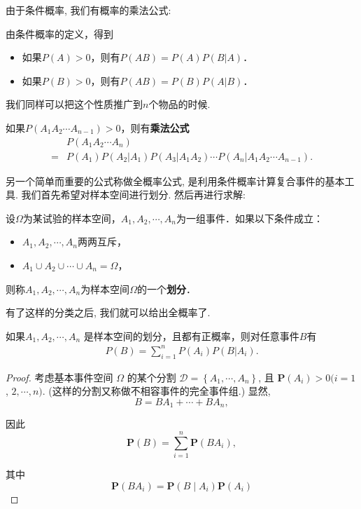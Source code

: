 由于条件概率, 我们有概率的乘法公式:

\begin{theorem}[乘法公式]
    由条件概率的定义，得到
    \begin{itemize}
        \item 如果$P(A)>0$，则有$P(AB)=P(A)P(B|A)$．
        \item 如果$P(B)>0$，则有$P(AB)=P(B)P(A|B)$．
    \end{itemize}
\end{theorem}

我们同样可以把这个性质推广到$n$个物品的时候.

\begin{corollary}
    如果$P(A_1 A_2\cdots A_{n-1})>0$，则有\textbf{乘法公式}
    \begin{align*}
          & P(A_1A_2\cdots A_n)                                                \\
        = & P(A_1)P(A_2|A_1)P(A_3|A_1 A_2)\cdots P(A_n|A_1 A_2\cdots A_{n-1}).
    \end{align*}
\end{corollary}



另一个简单而重要的公式称做全概率公式, 是利用条件概率计算复合事件的基本工具. 我们首先希望对样本空间进行划分. 然后再进行求解:

\begin{definition}
    设$\Omega$为某试验的样本空间，$A_1, A_2, \cdots, A_n$为一组事件．如果以下条件成立：
    \begin{itemize}
        \item $A_1, A_2, \cdots, A_n$两两互斥，
        \item $A_1 \cup A_2 \cup \cdots \cup A_n=\Omega$，
    \end{itemize}
    则称$A_1, A_2, \cdots , A_n$为样本空间$\Omega$的一个\textbf{划分}．
\end{definition}


有了这样的分类之后, 我们就可以给出全概率了.

\begin{theorem}[全概率公式]
    如果$A_1, A_2, \cdots, A_n$ 是样本空间的划分，且都有正概率，则对任意事件$B$有
    \begin{align*}
        P(B)=\sum_{i=1}^n P(A_i) P(B|A_i).
    \end{align*}
\end{theorem}

\begin{proof}
    考虑基本事件空间 $\Omega$ 的某个分割 $\mathscr{D}=\left\{A_1, \cdots, A_n\right\}$, 且 $\mathbf{P}\left(A_i\right)>0(i=1$, $2, \cdots, n)$. (这样的分割又称做不相容事件的完全事件组.) 显然,
$$
B=B A_1+\cdots+B A_n,
$$

因此
$$
\mathbf{P}(B)=\sum_{i=1}^n \mathbf{P}\left(B A_i\right),
$$

其中
$$
\mathbf{P}\left(B A_i\right)=\mathbf{P}\left(B \mid A_i\right) \mathbf{P}\left(A_i\right)
$$
\end{proof}



